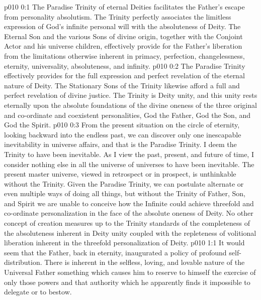 \author{Universal Censor}
\vs p010 0:1 The Paradise Trinity of eternal Deities facilitates the Father’s escape from personality absolutism. The Trinity perfectly associates the limitless expression of God’s infinite personal will with the absoluteness of Deity. The Eternal Son and the various Sons of divine origin, together with the Conjoint Actor and his universe children, effectively provide for the Father’s liberation from the limitations otherwise inherent in primacy, perfection, changelessness, eternity, universality, absoluteness, and infinity.\plusone
\vs p010 0:2 The Paradise Trinity effectively provides for the full expression and perfect revelation of the eternal nature of Deity. The Stationary Sons of the Trinity likewise afford a full and perfect revelation of divine justice. The Trinity is Deity unity, and this unity rests eternally upon the absolute foundations of the divine oneness of the three original and co\hyp{}ordinate and coexistent personalities, God the Father, God the Son, and God the Spirit.
\pc \vs p010 0:3 From the present situation on the circle of eternity, looking backward into the endless past, we can discover only one inescapable inevitability in universe affairs, and that is the Paradise Trinity. I deem the Trinity to have been inevitable. As I view the past, present, and future of time, I consider nothing else in all the universe of universes to have been inevitable. The present master universe, viewed in retrospect or in prospect, is unthinkable without the Trinity. Given the Paradise Trinity, we can postulate alternate or even multiple ways of doing all things, but without the Trinity of Father, Son, and Spirit we are unable to conceive how the Infinite could achieve threefold and co\hyp{}ordinate personalization in the face of the absolute oneness of Deity. No other concept of creation measures up to the Trinity standards of the completeness of the absoluteness inherent in Deity unity coupled with the repleteness of volitional liberation inherent in the threefold personalization of Deity.
\vs p010 1:1 It would seem that the Father, back in eternity, inaugurated a policy of profound self\hyp{}distribution. There is inherent in the selfless, loving, and lovable nature of the Universal Father something which causes him to reserve to himself the exercise of only those powers and that authority which he apparently finds it impossible to delegate or to bestow.
